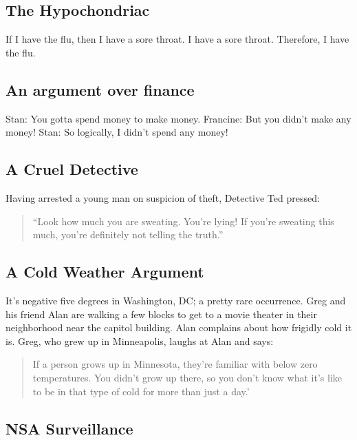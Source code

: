 \documentclass[]{article}
\date{}
\begin{document}
\subsection{The Hypochondriac}\label{the-hypochondriac}

If I have the flu, then I have a sore throat. I have a sore throat.
Therefore, I have the flu.

\subsection{An argument over finance}\label{an-argument-over-finance}

Stan: You gotta spend money to make money. Francine: But you didn't make
any money! Stan: So logically, I didn't spend any money!

\subsection{A Cruel Detective}\label{a-cruel-detective}

Having arrested a young man on suspicion of theft, Detective Ted
pressed:

\begin{quote}
``Look how much you are sweating. You're lying! If you're sweating this
much, you're definitely not telling the truth.''
\end{quote}

\subsection{A Cold Weather Argument}\label{a-cold-weather-argument}

It's negative five degrees in Washington, DC; a pretty rare occurrence.
Greg and his friend Alan are walking a few blocks to get to a movie
theater in their neighborhood near the capitol building. Alan complains
about how frigidly cold it is. Greg, who grew up in Minneapolis, laughs
at Alan and says:

\begin{quote}
If a person grows up in Minnesota, they're familiar with below zero
temperatures. You didn't grow up there, so you don't know what it's like
to be in that type of cold for more than just a day.'
\end{quote}

\subsection{NSA Surveillance}\label{nsa-surveillance}
\end{document}
